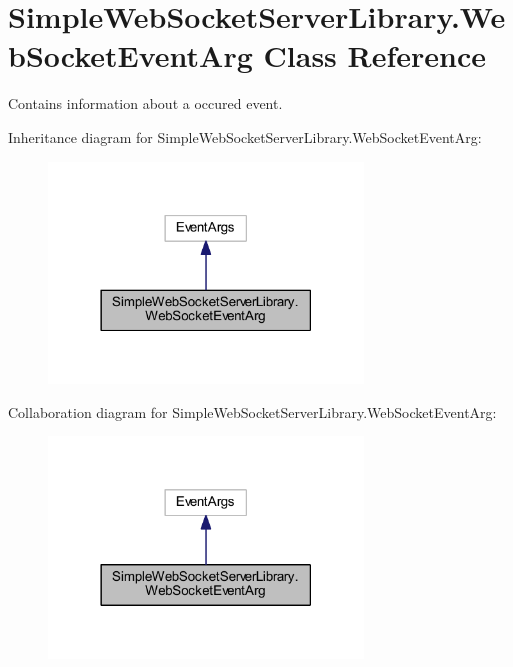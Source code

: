 \hypertarget{class_simple_web_socket_server_library_1_1_web_socket_event_arg}{}\section{Simple\+Web\+Socket\+Server\+Library.\+Web\+Socket\+Event\+Arg Class Reference}
\label{class_simple_web_socket_server_library_1_1_web_socket_event_arg}


Contains information about a occured event.  




Inheritance diagram for Simple\+Web\+Socket\+Server\+Library.\+Web\+Socket\+Event\+Arg\+:
\nopagebreak
\begin{figure}[H]
\begin{center}
\leavevmode
\includegraphics[width=237pt]{class_simple_web_socket_server_library_1_1_web_socket_event_arg__inherit__graph}
\end{center}
\end{figure}


Collaboration diagram for Simple\+Web\+Socket\+Server\+Library.\+Web\+Socket\+Event\+Arg\+:
\nopagebreak
\begin{figure}[H]
\begin{center}
\leavevmode
\includegraphics[width=237pt]{class_simple_web_socket_server_library_1_1_web_socket_event_arg__coll__graph}
\end{center}
\end{figure}
